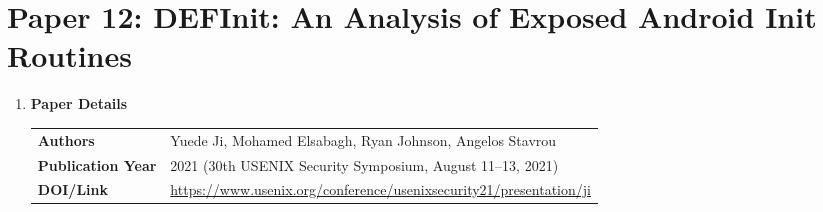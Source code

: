 \documentclass[11pt,a4paper]{article}
\newcommand{\entrypart}[1]{\textbf{\color{accent}#1}\par\vspace{2pt}}
\begin{document}
\newpage

\section{Paper 12: DEFInit: An Analysis of Exposed Android Init Routines}

\begin{enumerate}

    \item \entrypart{Paper Details}

    \begin{tabular}{@{}>{\bfseries}p{3.2cm} p{11.5cm}@{}}
        Authors          & Yuede Ji, Mohamed Elsabagh, Ryan Johnson, Angelos Stavrou \\[2pt]
        Publication Year & 2021 (30th USENIX Security Symposium, August 11--13, 2021) \\[2pt]
        DOI/Link         & \url{https://www.usenix.org/conference/usenixsecurity21/presentation/ji}
    \end{tabular}


\end{enumerate}
\end{document}

